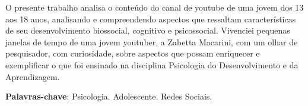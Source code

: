 
\setlength{\absparsep}{18pt} %
\begin{resumo}
 O presente trabalho analisa o conteúdo do canal de youtube de uma jovem dos 13 aos 18 anos, analisando e compreendendo aspectos que ressaltam características  de seu desenvolvimento biossocial, cognitivo e psicossocial. Vivenciei pequenas janelas de tempo de uma jovem youtuber, a Zabetta Macarini, com um olhar de pesquisador, com curiosidade, sobre aspectos que possam enriquecer e exemplificar o que foi ensinado na disciplina Psicologia do Desenvolvimento e da Aprendizagem.

 \textbf{Palavras-chave}: Psicologia. Adolescente. Redes Sociais.
\end{resumo}
